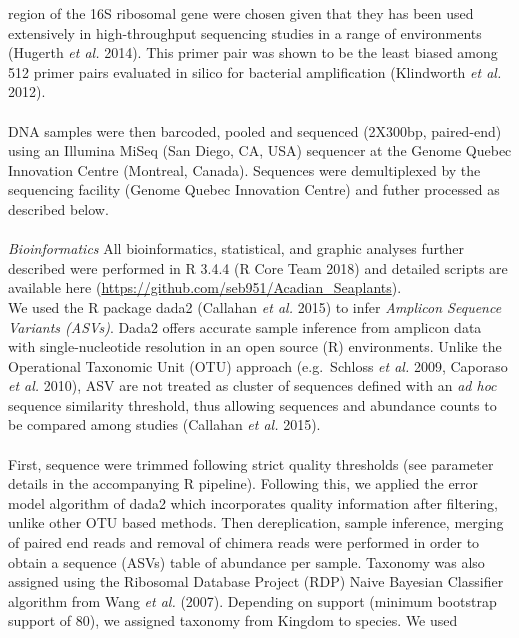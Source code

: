 \documentclass[11pt,]{article}
\begin{document}
region of the 16S ribosomal gene were chosen given that they has been
used extensively in high-throughput sequencing studies in a range of
environments (Hugerth \emph{et al.} 2014). This primer pair was shown to
be the least biased among 512 primer pairs evaluated in silico for
bacterial amplification (Klindworth \emph{et al.} 2012).\\
\hspace*{0.333em}\\
DNA samples were then barcoded, pooled and sequenced (2X300bp,
paired-end) using an Illumina MiSeq (San Diego, CA, USA) sequencer at
the Genome Quebec Innovation Centre (Montreal, Canada). Sequences were
demultiplexed by the sequencing facility (Genome Quebec Innovation
Centre) and futher processed as described below. ~\\
\hspace*{0.333em}\\
\emph{Bioinformatics} All bioinformatics, statistical, and graphic
analyses further described were performed in R 3.4.4 (R Core Team 2018)
and detailed scripts are available here
(\url{https://github.com/seb951/Acadian_Seaplants}). ~\\
We used the R package dada2 (Callahan \emph{et al.} 2015) to infer
\emph{Amplicon Sequence Variants (ASVs)}. Dada2 offers accurate sample
inference from amplicon data with single-nucleotide resolution in an
open source (R) environments. Unlike the Operational Taxonomic Unit
(OTU) approach (e.g.~Schloss \emph{et al.} 2009, Caporaso \emph{et al.}
2010), ASV are not treated as cluster of sequences defined with an
\emph{ad hoc} sequence similarity threshold, thus allowing sequences and
abundance counts to be compared among studies (Callahan \emph{et al.}
2015).\\
\hspace*{0.333em}\\
First, sequence were trimmed following strict quality thresholds (see
parameter details in the accompanying R pipeline). Following this, we
applied the error model algorithm of dada2 which incorporates quality
information after filtering, unlike other OTU based methods. Then
dereplication, sample inference, merging of paired end reads and removal
of chimera reads were performed in order to obtain a sequence (ASVs)
table of abundance per sample. Taxonomy was also assigned using the
Ribosomal Database Project (RDP) Naive Bayesian Classifier algorithm
from Wang \emph{et al.} (2007). Depending on support (minimum bootstrap
support of 80), we assigned taxonomy from Kingdom to species. We used
\end{document}
